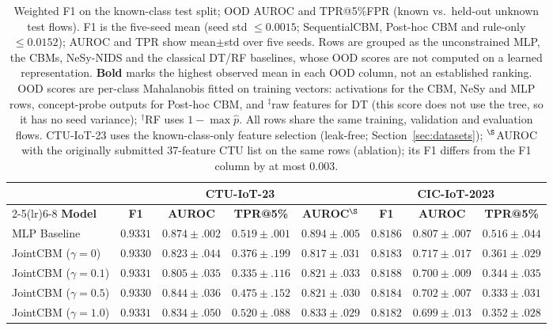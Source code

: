 \documentclass[journal]{IEEEtran}
\begin{document}
\begin{table}[!t]
\renewcommand{\arraystretch}{1.0}
\caption{Weighted F1 on the known-class test split; OOD AUROC and TPR@5\%FPR (known vs.\ held-out unknown test flows). F1 is the five-seed mean (seed std ${\le}0.0015$; SequentialCBM, Post-hoc CBM and rule-only ${\le}0.0152$); AUROC and TPR show mean$\pm$std over five seeds. Rows are grouped as the unconstrained MLP, the CBMs, NeSy-NIDS and the classical DT/RF baselines, whose OOD scores are not computed on a learned representation. \textbf{Bold} marks the highest observed mean in each OOD column, not an established ranking. OOD scores are per-class Mahalanobis fitted on training vectors: activations for the CBM, NeSy and MLP rows, concept-probe outputs for Post-hoc CBM, and $^\ddagger$raw features for DT (this score does not use the tree, so it has no seed variance); $^\dagger$RF uses $1{-}\max\hat{p}$. All rows share the same training, validation and evaluation flows. CTU-IoT-23 uses the known-class-only feature selection (leak-free; Section~\ref{sec:datasets}); $^\S$AUROC with the originally submitted 37-feature CTU list on the same rows (ablation); its F1 differs from the F1 column by at most $0.003$.}
\label{tab:main}
\centering
\small
\begin{tabular}{lccccccc}
\toprule
& \multicolumn{4}{c}{\textbf{CTU-IoT-23}} &
  \multicolumn{3}{c}{\textbf{CIC-IoT-2023}} \\
\cmidrule(lr){2-5}\cmidrule(lr){6-8}
\textbf{Model} & \textbf{F1} & \textbf{AUROC} & \textbf{TPR@5\%} & \textbf{AUROC}$^\S$ &
                 \textbf{F1} & \textbf{AUROC} & \textbf{TPR@5\%} \\
\midrule
MLP Baseline
  & $0.9331$ & $0.874{\pm}.002$ & $0.519{\pm}.001$ & $0.894{\pm}.005$
  & $0.8186$ & $\mathbf{0.807{\pm}.007}$ & $0.516{\pm}.044$ \\
\midrule
JointCBM ($\gamma{=}0$)
  & $0.9330$ & $0.823{\pm}.044$ & $0.376{\pm}.199$ & $0.817{\pm}.031$
  & $0.8183$ & $0.717{\pm}.017$ & $0.361{\pm}.029$ \\
JointCBM ($\gamma{=}0.1$)
  & $0.9331$ & $0.805{\pm}.035$ & $0.335{\pm}.116$ & $0.821{\pm}.033$
  & $0.8188$ & $0.700{\pm}.009$ & $0.344{\pm}.035$ \\
JointCBM ($\gamma{=}0.5$)
  & $0.9330$ & $0.844{\pm}.036$ & $0.475{\pm}.152$ & $0.821{\pm}.030$
  & $0.8184$ & $0.702{\pm}.007$ & $0.333{\pm}.031$ \\
JointCBM ($\gamma{=}1.0$)
  & $0.9331$ & $0.834{\pm}.050$ & $0.520{\pm}.088$ & $0.833{\pm}.029$
  & $0.8182$ & $0.699{\pm}.013$ & $0.352{\pm}.028$ \\

\end{tabular}
\end{table}
\end{document}
